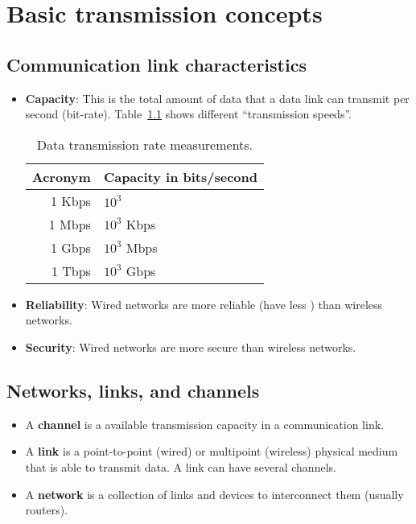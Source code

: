 \chapter{Basic transmission concepts}

\section{Communication link characteristics}
\begin{itemize}
\item \textbf{Capacity}: This is the total amount of data that a data
  link can transmit per second (bit-rate). Table~\ref{tab:BR_measures}
  shows different ``transmission speeds''.
  \begin{table}[!h]
    \vspace{2ex}
    \begin{center}
      \begin{tabular}{r|l}
        Acronym & Capacity in bits/second\\
        \hline
        1 Kbps & $10^3$\\
        1 Mbps & $10^3$ Kbps\\
        1 Gbps & $10^3$ Mbps\\
        1 Tbps & $10^3$ Gbps
      \end{tabular}
    \end{center}
    \caption{Data transmission rate measurements.}
    \label{tab:BR_measures}
  \end{table}
\item \textbf{Reliability}: Wired networks are more reliable
(have less ) than wireless networks.
\item \textbf{Security}: Wired networks are more secure than wireless
networks.
\end{itemize}

\section{Networks, links, and channels}
\begin{itemize}
\item A \textbf{channel} is a available transmission capacity in a communication link.
\item A \textbf{link} is a point-to-point (wired) or multipoint
(wireless) physical medium that is able to transmit data. A link can have several channels.
\item A \textbf{network} is a collection of links and devices to
interconnect them (usually routers).
\end{itemize}

